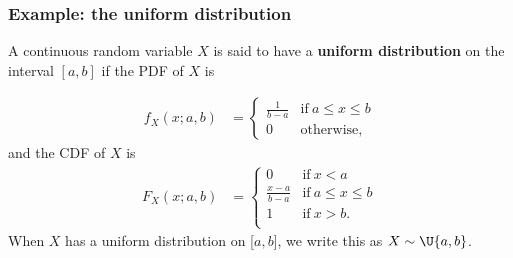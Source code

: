 \documentclass[9pt]{beamer}
\begin{document}
\begin{frame}
\frametitle{Example: the uniform distribution}

\vspace{-.05cm}

\begin{definition}
A continuous random variable $X$ is said to have a \textbf{uniform distribution} on the interval ${[a, b]}$ if the PDF of $X$ is

\vspace{-.5cm}

\begin{align*}
    f_X(x; a, b) &= 
    \begin{cases}
      \frac{1}{b-a} & \text{if}\ a \leq x \leq b \\
      0 & \text{otherwise,}
    \end{cases}
\end{align*}
and the CDF of $X$ is
\begin{align*}
F_X(x; a, b) &= 
    \begin{cases}
      0 & \text{if}\ x < a \\
      \frac{x-a}{b-a} & \text{if}\ a \leq x \leq b \\
      1 &\text{if}\ x > b. \\
    \end{cases}
\end{align*}
When $X$ has a uniform distribution on [$a, b$], we write this as $X \sim \U{a,b}$. 
\end{definition}



\

\end{frame}
\end{document}
